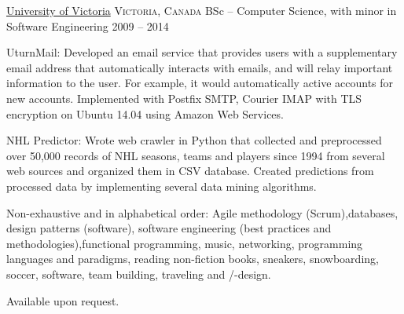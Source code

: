 \documentclass[10pt,a4paper]{article}
\begin{document}
\spacedhrule{1.6em}{-0.4em}


\headedsection
  {\href{https://www.uvic.ca/}{University of Victoria}}
  {\textsc{Victoria, Canada}} {
  \headedsubsection
    {BSc -- Computer Science, with minor in Software Engineering}
    {2009 -- 2014}
    {}
}

\spacedhrule{0.5em}{-0.4em}

\inlineheadsection
  {UturnMail:}
  {Developed an email service that provides users with a supplementary
email address that automatically interacts with emails, and will relay important information to the user. For example, it would automatically active accounts for new accounts.
Implemented with Postfix SMTP, Courier IMAP with TLS encryption on Ubuntu 14.04 using Amazon Web Services.}

\vspace{0.5em}
\inlineheadsection
  {NHL Predictor:}
  {Wrote web crawler in Python that collected and preprocessed over
50,000 records of NHL seasons, teams and players since 1994 from several web sources and organized them
in CSV database. Created predictions from processed data by implementing several data mining algorithms.}

\spacedhrule{1.6em}{-0.4em}


\inlineheadsection
  {Non-exhaustive and in alphabetical order:}
  {Agile methodology (Scrum),databases, design patterns (software), software engineering (best practices and methodologies),functional programming, music, networking, programming languages and paradigms, reading non-fiction books, sneakers, snowboarding, soccer, software, team building, traveling and /-design.}

\spacedhrule{1.6em}{-0.4em}



\inlineheadsection
  {Available upon request.}
\end{document}
